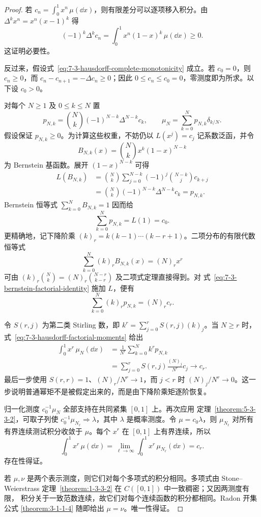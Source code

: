 \begin{proof}
若 $c_n=\int_0^1x^n\,\mu(\dd x)$，则有限差分可以逐项移入积分。由
$\Delta^kx^n=x^n(x-1)^k$ 得
\[
 (-1)^k\Delta^kc_n
 =\int_0^1x^n(1-x)^k\,\mu(\dd x)\geq0.
\]
这证明必要性。

反过来，假设式~\eqref{eq:7-3-hausdorff-complete-monotonicity} 成立。若 $c_0=0$，则
$c_n\geq0$，而 $c_n-c_{n+1}=-\Delta c_n\geq0$；因此
$0\leq c_n\leq c_0=0$，零测度即为所求。以下设 $c_0>0$。

对每个 $N\geq1$ 及 $0\leq k\leq N$ 置
\begin{equation}\label{eq:7-3-hausdorff-weights}
 p_{N,k}=\binom Nk(-1)^{N-k}\Delta^{N-k}c_k,
 \qquad
 \mu_N=\sum_{k=0}^Np_{N,k}\delta_{k/N}.
\end{equation}
假设保证 $p_{N,k}\geq0$。为计算这些权重，不妨仍以 $L(x^j)=c_j$ 记系数泛函，并令
\[
 B_{N,k}(x)=\binom Nkx^k(1-x)^{N-k}
\]
为 Bernstein 基函数。展开 $(1-x)^{N-k}$ 可得
\begin{align*}
 L(B_{N,k})
 &=\binom Nk\sum_{j=0}^{N-k}(-1)^j\binom{N-k}{j}c_{k+j}\\
 &=\binom Nk(-1)^{N-k}\Delta^{N-k}c_k=p_{N,k}.
\end{align*}
Bernstein 恒等式 $\sum_{k=0}^NB_{N,k}=1$ 因而给
\[
 \sum_{k=0}^Np_{N,k}=L(1)=c_0.
\]
更精确地，记下降阶乘 $(k)_r=k(k-1)\cdots(k-r+1)$。二项分布的有限代数恒等式
\begin{equation}\label{eq:7-3-bernstein-factorial-identity}
 \sum_{k=0}^N(k)_rB_{N,k}(x)=(N)_rx^r
\end{equation}
可由
$(k)_r\binom Nk=(N)_r\binom{N-r}{k-r}$ 及二项式定理直接得到。对
式~\eqref{eq:7-3-bernstein-factorial-identity} 施加 $L$，便有
\begin{equation}\label{eq:7-3-hausdorff-factorial-moments}
 \sum_{k=0}^N(k)_rp_{N,k}=(N)_rc_r.
\end{equation}

令 $S(r,j)$ 为第二类 Stirling 数，即
$k^r=\sum_{j=0}^rS(r,j)(k)_j$。当 $N\geq r$ 时，
式~\eqref{eq:7-3-hausdorff-factorial-moments} 给出
\begin{align*}
 \int_0^1x^r\,\mu_N(\dd x)
 &=\frac1{N^r}\sum_{k=0}^Nk^rp_{N,k}\\
 &=\sum_{j=0}^rS(r,j)\frac{(N)_j}{N^r}c_j
 \longrightarrow c_r.
\end{align*}
最后一步使用 $S(r,r)=1$、$(N)_r/N^r\to1$，而 $j<r$ 时
$(N)_j/N^r\to0$。这一步说明普通幂矩不是被假定出来的，而是由下降阶乘矩逐阶恢复。

归一化测度 $c_0^{-1}\mu_N$ 全部支持在共同紧集 $[0,1]$ 上。再次应用
定理~\ref{theorem:5-3-3-2}，可取子列使
$c_0^{-1}\mu_{N_\ell}\Rightarrow\lambda$，其中 $\lambda$ 是概率测度。令 $\mu=c_0\lambda$，则
$\mu_{N_\ell}$ 对所有有界连续测试积分收敛于 $\mu$。每个 $x^r$ 在 $[0,1]$ 上有界连续，所以
\[
 \int_0^1x^r\,\mu(\dd x)
 =\lim_{\ell\to\infty}\int_0^1x^r\,\mu_{N_\ell}(\dd x)=c_r.
\]
存在性得证。

若 $\mu,\nu$ 是两个表示测度，则它们对每个多项式的积分相同。多项式由
Stone--Weierstrass 定理~\ref{theorem:1-3-3-2} 在 $C([0,1])$ 中一致稠密；又因两测度有限，
积分关于一致范数连续，故它们对每个连续函数的积分都相同。Radon 开集公式
\ref{theorem:3-1-1-4} 随即给出 $\mu=\nu$。唯一性得证。
\end{proof}

